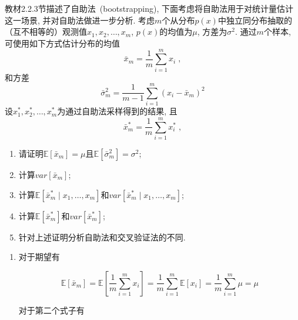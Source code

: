 \documentclass[answers]{exam}  %
\begin{document}
\begin{questions}
  教材2.2.3节描述了自助法~(bootstrapping), 下面考虑将自助法用于对统计量估计这一场景, 并对自助法做进一步分析.
  考虑$m$个从分布$p(x)$中独立同分布抽取的（互不相等的）观测值$x_1, x_2, \ldots, x_m$, $p(x)$的均值为$\mu$, 方差为$\sigma^2$. 通过$m$个样本, 可使用如下方式估计分布的均值
  \begin{equation}
    \bar{x}_m = \frac{1}{m} \sum_{i=1}^{m} x_{i}\;,\label{ch2_eq:estimate_mean}
  \end{equation}
  和方差
  \begin{equation}
    \bar{\sigma}^2_m=\frac{1}{m-1} \sum_{i=1}^{m}\left(x_{i}-\bar{x}_m\right)^{2}\label{ch2_eq:estimate_variance}
  \end{equation}
  设$x^*_1, x^*_2, \ldots, x^*_m$为通过自助法采样得到的结果, 且
  \begin{equation}
    \bar{x}^*_m = \frac{1}{m} \sum_{i=1}^{m} x^*_{i}\;,
  \end{equation}
  \begin{enumerate}
    \item 请证明$\mathbb E[\bar{x}_m] = \mu$且$\mathbb E[\bar{\sigma}^2_m] = \sigma^2$;
    \item 计算$var[\bar{x}_m]$;
    \item 计算$\mathbb E[\bar{x}^*_m \mid x_1, \ldots, x_m]$和$var[\bar{x}^*_m \mid x_1, \ldots, x_m]$;
    \item 计算$\mathbb E[\bar{x}^*_m]$和$var[\bar{x}^*_m]$;
    \item 针对上述证明分析自助法和交叉验证法的不同.
  \end{enumerate}

  \begin{solution}
    \begin{enumerate}
      \item 对于期望有

            \begin{equation}
              \mathbb{E}[\bar{x}_m] = \mathbb{E}[\frac{1}{m}\sum_{i=1}^{m} x_i] = \frac{1}{m} \sum_{i=1}^{m} \mathbb{E}[x_i] = \frac{1}{m} \sum_{i=1}^{m} \mu = \mu
            \end{equation}

            对于第二个式子有


\end{enumerate}
\end{solution}
\end{questions}
\end{document}
